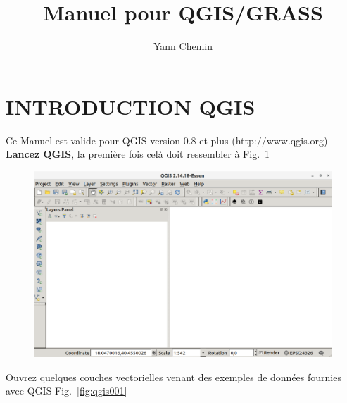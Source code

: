 %

\graphicspath{{./images/}}

\title{Manuel pour QGIS/GRASS}
\subtitle{}
\author{Yann Chemin}

\maketitle

\section{INTRODUCTION QGIS}

Ce Manuel est valide pour QGIS version 0.8 et plus (http://www.qgis.org)
\textbf{Lancez QGIS}, la premi\`ere fois cel\`a doit ressembler \`a Fig.~\ref{fig:qgis000}

\begin{figure}[htbp]
   \centering
   \includegraphics[scale=0.18]{qgis000.png}
   \caption{}
   \label{fig:qgis000}
\end{figure}

Ouvrez quelques couches vectorielles venant des exemples de donn\'ees fournies avec QGIS Fig.~\ref{fig:qgis001}

